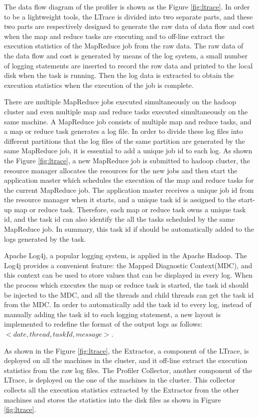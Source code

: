 The data flow diagram of the profiler is shown as the Figure \ref{fig:ltrace}. In order to be a lightweight tools, the LTrace is divided into two separate parts, and these two parts are respectively designed to generate the raw data of data flow and cost when the map and reduce tasks are executing and to off-line extract the execution statistics of the MapReduce job from the raw data. The raw data of the data flow and cost is generated by means of the log system, a small number of logging statements are inserted to record the row data and printed to the local disk when the task is running. Then the log data is extracted to obtain the execution statistics when the execution of the job is complete.

There are multiple MapReduce jobs executed simultaneously on the hadoop cluster and even multiple map and reduce tasks executed simultaneously on the same machine. A MapReduce job consists of multiple map and reduce tasks, and a map or reduce task generates a log file. In order to divide these log files into different partitions that the log files of the same partition are generated by the same MapReduce job, it is essential to add a unique job id to each log. As shown the Figure \ref{fig:ltrace}, a new MapReduce job is submitted to hadoop cluster, the resource manager allocates the resources for the new jobs  and then start the application master which schedules the execution of the map and reduce tasks for the current MapReduce job. The application master receives a unique job id from the resource manager when it starts, and a unique task id is assigned to the start-up map or reduce task. Therefore, each map or reduce task owns a unique task id, and the task id can also identify the all the tasks scheduled by the same MapReduce job. In summary, this task id if should be automatically added to the logs generated by the task.

Apache Log4j, a popular logging system, is applied in the Apache Hadoop. The Log4j provides a convenient feature: the Mapped Diagnostic Context(MDC), and this context can be used to store values that can be displayed in every log. When the process which executes the map or reduce task is started, the task id should be injected to the MDC, and all the threads and child threads can get the task id from the MDC. In order to automatically add the task id to every log, instead of manually adding the task id to each logging statement, a new layout is implemented to redefine the format of the output logs as follows: $<date, thread, taskId, message>$.

As shown in the Figure \ref{fig:ltrace}, the Extractor, a component of the LTrace, is deployed on all the machines in the cluster, and it off-line extract the execution statistics from the raw log files. The Profiler Collector, another component of the LTrace, is deployed on the one of the machines in the cluster. This collector collects all the execution statistics extracted by the Extractor from the other machines and stores the statistics into the disk files as shown in Figure \ref{fig:ltrace}.
